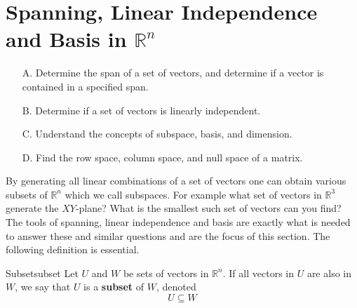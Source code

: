 \newpage
\section{Spanning, Linear Independence and Basis in \texorpdfstring{$\mathbb{R}^{n}$}{Rn}}

\begin{outcome}

\begin{enumerate}
\item[A.] Determine the span of a set of vectors, and determine if a vector is contained in a specified span.

\item[B.] Determine if a set of vectors is linearly independent.

\item[C.] Understand the concepts of subspace, basis, and dimension.

\item[D.] Find the row space, column space, and null space of a matrix.
\end{enumerate}
\end{outcome}

By generating all linear combinations of a set of vectors one can
obtain various subsets of $\mathbb{R}^{n}$ which we call
subspaces. For example what set of vectors in $\mathbb{R}^{3}$
generate the $XY$-plane? What is the smallest such set of vectors can
you find? The tools of spanning, linear independence and basis are
exactly what is needed to answer these and similar questions and are the focus of this section. The following definition is essential.

\begin{definition}{Subset}{subset}
Let $U$ and $W$ be sets of vectors in $\mathbb{R}^n$. If all vectors in $U$ are also in $W$, we say that $U$ is a \textbf{subset} of $W$, denoted 
\[
U \subseteq W
\]
\end{definition}